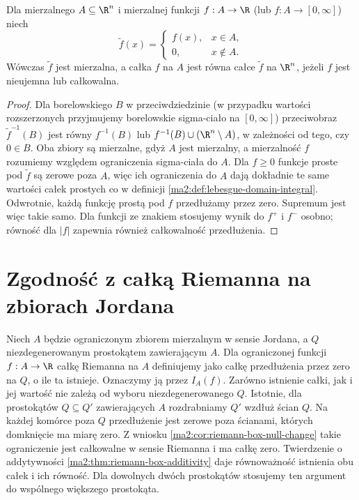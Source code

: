 \begin{stwierdzenie}
\label{ma2:prop:lebesgue-zero-extension}
Dla mierzalnego $A\subseteq\R^n$ i mierzalnej
funkcji $f:A\to\R$ (lub $f:A\to[0,\infty]$) niech
\[
 \widetilde f(x)=
 \begin{cases}
 f(x),&x\in A,\\
 0,&x\notin A.
 \end{cases}
\]
Wówczas $\widetilde f$ jest mierzalna,
a całka $f$ na $A$ jest równa całce
$\widetilde f$ na $\R^n$, jeżeli $f$
jest nieujemna lub całkowalna.
\end{stwierdzenie}
\begin{proof}
Dla borelowskiego $B$ w przeciwdziedzinie
(w przypadku wartości rozszerzonych przyjmujemy
borelowskie sigma-ciało na $[0,\infty]$) przeciwobraz
$\widetilde f^{-1}(B)$ jest równy
$f^{-1}(B)$ lub $f^{-1}(B)\cup(\R^n\setminus A)$,
w zależności od tego, czy $0\in B$.
Oba zbiory są mierzalne, gdyż $A$
jest mierzalny, a mierzalność $f$
rozumiemy względem ograniczenia sigma-ciała do $A$.
Dla $f\ge0$ funkcje proste pod $\widetilde f$
są zerowe poza $A$, więc ich ograniczenia
do $A$ dają dokładnie te same wartości całek
prostych co w definicji
\ref{ma2:def:lebesgue-domain-integral}.
Odwrotnie, każdą funkcję prostą pod $f$
przedłużamy przez zero. Supremum jest więc
takie samo. Dla funkcji ze znakiem stosujemy
wynik do $f^+$ i $f^-$ osobno; równość dla
$|f|$ zapewnia również całkowalność przedłużenia.
\end{proof}

\section{Zgodność z całką Riemanna na zbiorach Jordana}

Niech $A$ będzie ograniczonym zbiorem
mierzalnym w sensie Jordana, a $Q$
niezdegenerowanym prostokątem zawierającym $A$.
Dla ograniczonej funkcji $f:A\to\R$
całkę Riemanna na $A$ definiujemy jako
całkę przedłużenia przez zero na $Q$,
o ile ta istnieje. Oznaczymy ją przez $I_A(f)$.
Zarówno istnienie całki, jak i jej wartość nie zależą od wyboru niezdegenerowanego $Q$.
Istotnie, dla prostokątów $Q\subseteq Q'$
zawierających $A$ rozdrabniamy $Q'$ wzdłuż
ścian $Q$. Na każdej komórce poza $Q$
przedłużenie jest zerowe poza ścianami,
których domknięcie ma miarę zero.
Z wniosku \ref{ma2:cor:riemann-box-null-change}
takie ograniczenie jest całkowalne
w sensie Riemanna i ma całkę zero.
Twierdzenie o addytywności
\ref{ma2:thm:riemann-box-additivity}
daje równoważność istnienia obu całek
i ich równość. Dla dowolnych dwóch
prostokątów stosujemy ten argument do
wspólnego większego prostokąta.

